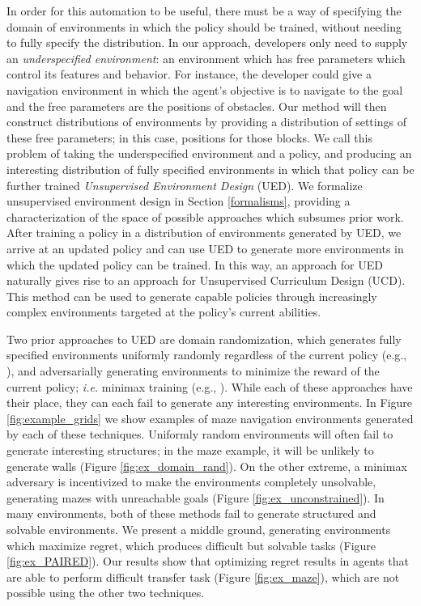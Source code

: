 \documentclass{article}
\begin{document}
In order for this automation to be useful, there must be a way of specifying the domain of environments in which the policy should be trained, without needing to fully specify the distribution.
In our approach, developers only need to supply an \emph{underspecified environment}: an environment which has free parameters which control its features and behavior. For instance, the developer could give a navigation environment in which the agent's objective is to navigate to the goal and the free parameters are the positions of obstacles.  Our method will then construct distributions of environments by providing a distribution of settings of these free parameters; in this case, positions for those blocks.  We call this problem of taking the underspecified environment and a policy,
and producing an interesting distribution of fully specified environments in which that policy can be further trained \emph{Unsupervised Environment Design} (UED).  We formalize unsupervised environment design in Section \ref{formalisms}, providing a characterization of the space of possible approaches which subsumes prior work. After training a policy in a distribution of environments generated by UED, we arrive at an updated policy and can use UED to generate more environments in which the updated policy can be trained.  In this way, an approach for UED naturally gives rise to an approach for Unsupervised Curriculum Design (UCD).  This method can be used to generate capable policies through increasingly complex environments targeted at the policy's current abilities.

Two prior approaches
to UED are domain randomization, which generates fully specified environments uniformly randomly regardless of the current policy (e.g., \citep{jakobi1997evolutionary,sadeghi2016cad2rl,tobin2017domain}), and adversarially generating environments to minimize the reward of the current policy; \textit{i.e.} minimax training (e.g., \citep{pinto2017supervision, morimoto2001robust,vinitsky2020dmalt,khirodkar2018vadra}).
While each of these approaches have their place, they can each fail to generate any interesting environments. In Figure \ref{fig:example_grids} we show examples of maze navigation environments generated by each of these techniques.  Uniformly random environments will often fail to generate interesting structures; in the maze example, it will be unlikely to generate walls (Figure \ref{fig:ex_domain_rand}).
On the other extreme, a minimax adversary is incentivized to make the environments completely unsolvable, generating mazes with unreachable goals (Figure \ref{fig:ex_unconstrained}).  In many environments, both of these methods fail to generate structured and solvable environments. We present a middle ground, generating environments which maximize regret, which produces difficult but solvable tasks (Figure \ref{fig:ex_PAIRED}). Our results show that optimizing regret results in agents that are able to perform difficult transfer task (Figure \ref{fig:ex_maze}), which are not possible using the other two techniques.  
\end{document}
